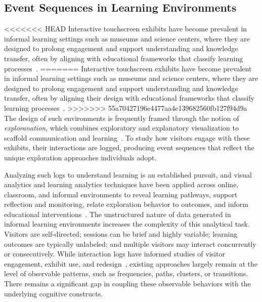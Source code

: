 \subsection{Event Sequences in Learning Environments}

<<<<<<< HEAD
Interactive touchscreen exhibits have become prevalent in informal learning settings such as museums and science centers, where they are designed to prolong engagement and support understanding and knowledge transfer, often by aligning with educational frameworks that classify learning processes~\cite{andre2017museums}.
=======
Interactive touchscreen exhibits have become prevalent in informal learning settings such as museums and science centers, where they are designed to prolong engagement and support understanding and knowledge transfer, often by aligning their design with educational frameworks that classify learning processes~\cite{andre2017museums}.
>>>>>>> 55a70427196e4477aa4e139682560fb127f94d9a
The design of such environments is frequently framed through the notion of \textit{exploranation}, which combines exploratory and explanatory visualization to scaffold communication and learning~\cite{ynnerman2018exploranation}.
To study how visitors engage with these exhibits, their interactions are logged, producing event sequences that reflect the unique exploration approaches individuals adopt.

Analyzing such logs to understand learning is an established pursuit, and visual analytics and learning analytics techniques have been applied across online, classroom, and informal environments to reveal learning pathways, support reflection and monitoring, relate exploration behavior to outcomes, and inform educational interventions~\cite{chen2020viseq, mohseni2024visual, matcha2020systematic}.
The unstructured nature of data generated in informal learning environments increases the complexity of this analytical task.
Visitors are self-directed; sessions can be brief and highly variable; learning outcomes are typically unlabeled; and multiple visitors may interact concurrently or consecutively.
While interaction logs have informed studies of visitor engagement, exhibit use, and redesign~\cite{hinrichs2008emdialog, ma2020decoding}, existing approaches largely remain at the level of observable patterns, such as frequencies, paths, clusters, or transitions.
There remains a significant gap in coupling these observable behaviors with the underlying cognitive constructs.

